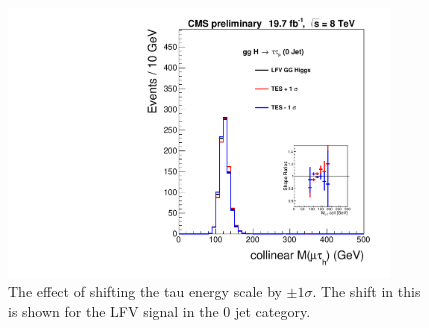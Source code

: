 \documentclass[oneside, letterpaper, oldfontcommands]{memoir}
\begin{document}
\begin{figure}[hbtp]\centering
\includegraphics[width=0.9\textwidth]{TES_Shift_8TeV.pdf}

\caption{The effect of shifting the tau energy scale by $\pm 1 \sigma$. The shift in this is shown for the LFV signal in the 0 jet category.} 
\label{fig:tesshift}\end{figure}
\end{document}
